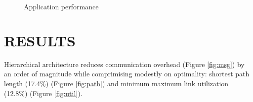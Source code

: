 \documentclass[a0,portrait]{a0poster}
\begin{document}
\begin{multicols}{2}
\begin{figure}[H]
  \begin{center}  
  \end{center}
\caption{Application performance}
\end{figure}

\color{SaddleBrown}
\section*{RESULTS}
\color{DarkSlateGray}
Hierarchical architecture reduces communication overhead (Figure \ref{fig:msg}) by an order of magnitude while comprimising modestly on optimality: shortest path length (17.4\%) (Figure \ref{fig:path}) and minimum maximum link utilization (12.8\%) (Figure \ref{fig:util}).


\end{multicols}
\end{document}

